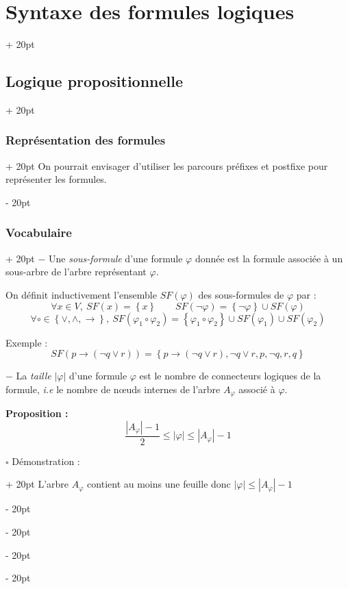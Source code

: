 \documentclass[a4paper, 12pt, twoside]{article}
\newcommand{\set}[1]{\left\{ #1 \right\}}
\newcommand{\abs}[1]{\left\lvert #1 \right\rvert}
\renewcommand{\le}{\leqslant}
\newcommand{\ind}[1][20pt]{\advance\leftskip + #1}
\newcommand{\deind}[1][20pt]{\advance\leftskip - #1}
\newenvironment{indt}[2][20pt]{#2 \par \ind[#1]}{\par \deind} %
\begin{document}
\begin{indt}{\section{Syntaxe des formules logiques}}
\begin{indt}{\subsection{Logique propositionnelle}}
\begin{indt}{\subsubsection{Représentation des formules}}
                On pourrait envisager d'utiliser les parcours préfixes et postfixe pour représenter les formules.
            \end{indt}
            
            \vspace{12pt}
            
            \begin{indt}{\subsubsection{Vocabulaire}}
                $-$ Une \textit{sous-formule} d'une formule $\varphi$ donnée est la formule associée à un sous-arbre de l'arbre représentant $\varphi$.
                
                On définit inductivement l'ensemble $SF(\varphi)$ des sous-formules de $\varphi$ par :
                    \[
                        \forall x \in V,\ SF(x) = \set x
                        \qquad
                        SF(\neg \varphi) = \set{\neg \varphi} \cup SF(\varphi)
                    \]
                    \[
                        \forall \circ \in \set{\vee, \wedge, \rightarrow},\ SF(\varphi_1 \circ \varphi_2) = \set{\varphi_1 \circ \varphi_2} \cup SF(\varphi_1) \cup SF(\varphi_2)
                    \]
                
                Exemple :
                    \[ SF(p \rightarrow (\neg q \vee r)) = \set{p \rightarrow (\neg q \vee r), \neg q \vee r, p, \neg q, r, q} \]
                
                \vspace{12pt}
                
                $-$ La \textit{taille} $\abs \varphi$ d'une formule $\varphi$ est le nombre de connecteurs logiques de la formule, \textit{i.e} le nombre de n\oe uds internes de l'arbre $A_\varphi$ associé à $\varphi$.
                
                \vspace{12pt}
                
                \textbf{Proposition :}
                    \[ \dfrac{\abs{A_\varphi} - 1}{2} \le \abs \varphi \le \abs{A_\varphi} - 1 \]
                
                \begin{indt}{$\square$ Démonstration :}
                    L'arbre $A_\varphi$ contient au moins une feuille donc $\abs \varphi \le \abs{A_\varphi} - 1$
                    

\end{indt}
\end{indt}
\end{indt}
\end{indt}
\end{document}
